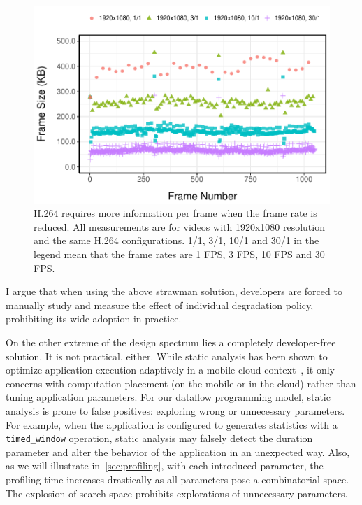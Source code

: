 \begin{figure}
  \centering
  \includegraphics[width=\columnwidth]{figures/h264.pdf}
  \caption{H.264 requires more information per frame when the frame rate is
    reduced. All measurements are for videos with 1920x1080 resolution and the
    same H.264 configurations. 1/1, 3/1, 10/1 and 30/1 in the legend mean that
    the frame rates are 1 FPS, 3 FPS, 10 FPS and 30 FPS.}
  \label{fig:h264}
\end{figure}

\vspace{0.5em}

I argue that when using the above strawman solution, developers are forced to
manually study and measure the effect of individual degradation policy,
prohibiting its wide adoption in practice.

On the other extreme of the design spectrum lies a completely developer-free
solution. It is not practical, either. While static analysis has been shown to
optimize application execution adaptively in a mobile-cloud
context~\cite{chun2011clonecloud}, it only concerns with computation placement
(on the mobile or in the cloud) rather than tuning application parameters.  For
our dataflow programming model, static analysis is prone to false positives:
exploring wrong or unnecessary parameters. For example, when the application is
configured to generates statistics with a \texttt{timed\_window} operation,
static analysis may falsely detect the duration parameter and alter the behavior
of the application in an unexpected way. Also, as we will illustrate
in~\autoref{sec:profiling}, with each introduced parameter, the profiling time
increases drastically as all parameters pose a combinatorial space. The
explosion of search space prohibits explorations of unnecessary parameters.

